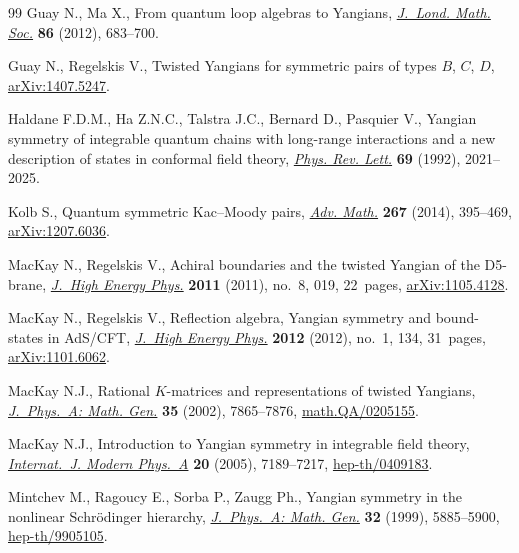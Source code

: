 \documentclass[pdftex]{sigma}
\numberwithin{theorem}{section}
\numberwithin{proposition}{section}
\numberwithin{lemma}{section}
\numberwithin{corollary}{section}
\numberwithin{definition}{section}
\numberwithin{example}{section}
\numberwithin{remark}{section}
\numberwithin{note}{section}
\numberwithin{equation}{section}
\begin{document}
\begin{thebibliography}{99}
Guay N., Ma X., From quantum loop algebras to {Y}angians, \href{http://dx.doi.org/10.1112/jlms/jds021}{\textit{J.~Lond.
  Math. Soc.}} \textbf{86} (2012), 683--700.

Guay N., Regelskis V., Twisted Yangians for symmetric pairs of types $B$, $C$, $D$,
\href{http://arxiv.org/abs/1407.5247}{arXiv:1407.5247}.

Haldane F.D.M., Ha Z.N.C., Talstra J.C., Bernard D., Pasquier V., Yangian
  symmetry of integrable quantum chains with long-range interactions and a new
  description of states in conformal f\/ield theory, \href{http://dx.doi.org/10.1103/PhysRevLett.69.2021}{\textit{Phys. Rev. Lett.}}
  \textbf{69} (1992), 2021--2025.

Kolb S., Quantum symmetric {K}ac--{M}oody pairs, \href{http://dx.doi.org/10.1016/j.aim.2014.08.010}{\textit{Adv. Math.}}
  \textbf{267} (2014), 395--469, \href{http://arxiv.org/abs/1207.6036}{arXiv:1207.6036}.

MacKay N., Regelskis V., Achiral boundaries and the twisted {Y}angian of the
  {D}5-brane, \href{http://dx.doi.org/10.1007/JHEP08(2011)019}{\textit{J.~High Energy Phys.}} \textbf{2011} (2011), no.~8, 019,
  22~pages, \href{http://arxiv.org/abs/1105.4128}{arXiv:1105.4128}.

MacKay N., Regelskis V., Ref\/lection algebra, {Y}angian symmetry and
  bound-states in {A}d{S}/{CFT}, \href{http://dx.doi.org/10.1007/JHEP01(2012)134}{\textit{J.~High Energy Phys.}} \textbf{2012}
  (2012), no.~1, 134, 31~pages, \href{http://arxiv.org/abs/1101.6062}{arXiv:1101.6062}.

MacKay N.J., Rational {$K$}-matrices and representations of twisted {Y}angians,
  \href{http://dx.doi.org/10.1088/0305-4470/35/37/302}{\textit{J.~Phys.~A: Math. Gen.}} \textbf{35} (2002), 7865--7876,
  \href{http://arxiv.org/abs/math.QA/0205155}{math.QA/0205155}.

MacKay N.J., Introduction to {Y}angian symmetry in integrable f\/ield theory,
  \href{http://dx.doi.org/10.1142/S0217751X05022317}{\textit{Internat.~J. Modern Phys.~A}} \textbf{20} (2005), 7189--7217,
  \href{http://arxiv.org/abs/hep-th/0409183}{hep-th/0409183}.

Mintchev M., Ragoucy E., Sorba P., Zaugg Ph., Yangian symmetry in the nonlinear
  {S}chr\"odinger hierarchy, \href{http://dx.doi.org/10.1088/0305-4470/32/32/304}{\textit{J.~Phys.~A: Math. Gen.}} \textbf{32}
  (1999), 5885--5900, \href{http://arxiv.org/abs/hep-th/9905105}{hep-th/9905105}.


\end{thebibliography}
\end{document}
